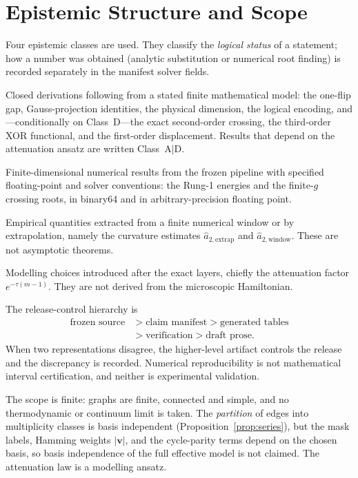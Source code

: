 \documentclass[10pt,twocolumn]{article}
\theoremstyle{definition}
\begin{document}
\section{Epistemic Structure and Scope}
Four epistemic classes are used. They classify the \emph{logical status} of a statement; how a number was obtained (analytic substitution or numerical root finding) is recorded separately in the manifest solver fields.
\begin{description}\setlength{\itemsep}{1pt}
\item[Class A: exact analytic results.] Closed derivations following from a stated finite mathematical model: the one-flip gap, Gauss-projection identities, the physical dimension, the logical encoding, and---conditionally on Class~D---the exact second-order crossing, the third-order XOR functional, and the first-order displacement. Results that depend on the attenuation ansatz are written Class~A$|$D.
\item[Class B: canonical numerical computations.] Finite-dimensional numerical results from the frozen pipeline with specified floating-point and solver conventions: the Rung-1 energies and the finite-$g$ crossing roots, in binary64 and in arbitrary-precision floating point.
\item[Class C: finite-window diagnostics.] Empirical quantities extracted from a finite numerical window or by extrapolation, namely the curvature estimates $\hat a_{2,\mathrm{extrap}}$ and $\hat a_{2,\mathrm{window}}$. These are not asymptotic theorems.
\item[Class D: phenomenological assumptions.] Modelling choices introduced after the exact layers, chiefly the attenuation factor $e^{-\tau(m-1)}$. They are not derived from the microscopic Hamiltonian.
\end{description}
The release-control hierarchy is
\[
\begin{aligned}\text{frozen source}&>\text{claim manifest}>\text{generated tables}\\&>\text{verification}>\text{draft prose}.\end{aligned}
\]
When two representations disagree, the higher-level artifact controls the release and the discrepancy is recorded. Numerical reproducibility is not mathematical interval certification, and neither is experimental validation.

The scope is finite: graphs are finite, connected and simple, and no thermodynamic or continuum limit is taken. The \emph{partition} of edges into multiplicity classes is basis independent (Proposition~\ref{prop:series}), but the mask labels, Hamming weights $|\mathbf v|$, and the cycle-parity terms depend on the chosen basis, so basis independence of the full effective model is not claimed. The attenuation law is a modelling ansatz.
\end{document}
